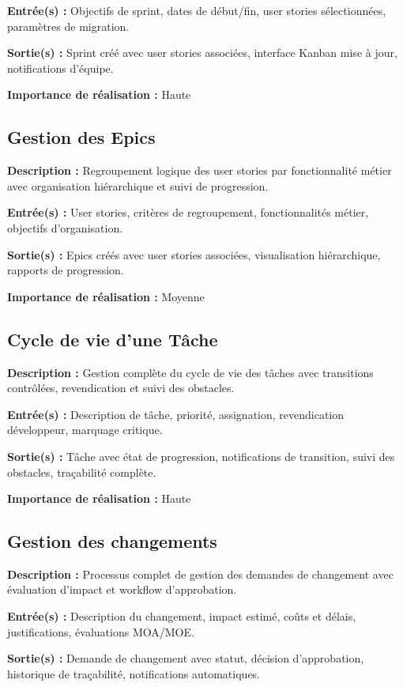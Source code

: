 \textbf{Entrée(s) :} Objectifs de sprint, dates de début/fin, user stories sélectionnées, paramètres de migration.

\textbf{Sortie(s) :} Sprint créé avec user stories associées, interface Kanban mise à jour, notifications d'équipe.

\textbf{Importance de réalisation :} Haute

\subsection{Gestion des Epics}
\textbf{Description :} Regroupement logique des user stories par fonctionnalité métier avec organisation hiérarchique et suivi de progression.

\textbf{Entrée(s) :} User stories, critères de regroupement, fonctionnalités métier, objectifs d'organisation.

\textbf{Sortie(s) :} Epics créés avec user stories associées, visualisation hiérarchique, rapports de progression.

\textbf{Importance de réalisation :} Moyenne

\subsection{Cycle de vie d'une Tâche}
\textbf{Description :} Gestion complète du cycle de vie des tâches avec transitions contrôlées, revendication et suivi des obstacles.

\textbf{Entrée(s) :} Description de tâche, priorité, assignation, revendication développeur, marquage critique.

\textbf{Sortie(s) :} Tâche avec état de progression, notifications de transition, suivi des obstacles, traçabilité complète.

\textbf{Importance de réalisation :} Haute

\subsection{Gestion des changements}
\textbf{Description :} Processus complet de gestion des demandes de changement avec évaluation d'impact et workflow d'approbation.

\textbf{Entrée(s) :} Description du changement, impact estimé, coûts et délais, justifications, évaluations MOA/MOE.

\textbf{Sortie(s) :} Demande de changement avec statut, décision d'approbation, historique de traçabilité, notifications automatiques.

